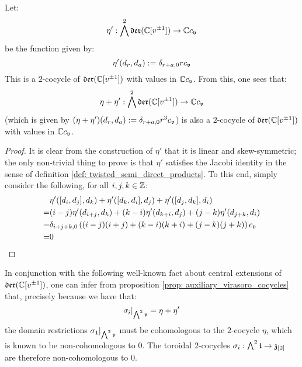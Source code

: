         \begin{proposition} \label{prop: auxiliary_virasoro_cocycles}
            Let:
                $$\eta': \bigwedge^2 \mathfrak{der}(\mathbb{C}[v^{\pm 1}]) \to \mathbb{C} c_{\mathfrak{v}}$$
            be the function given by:
                $$\eta'(d_r, d_a) := \delta_{r + a, 0} r c_{\mathfrak{v}}$$
            This is a $2$-cocycle of $\mathfrak{der}(\mathbb{C}[v^{\pm 1}])$ with values in $\mathbb{C} c_{\mathfrak{v}}$. From this, one sees that:
                $$\eta + \eta': \bigwedge^2 \mathfrak{der}(\mathbb{C}[v^{\pm 1}]) \to \mathbb{C} c_{\mathfrak{v}}$$
            (which is given by $(\eta + \eta')(d_r, d_a) := \delta_{r + a, 0} r^3 c_{\mathfrak{v}}$) is also a $2$-cocycle of $\mathfrak{der}(\mathbb{C}[v^{\pm 1}])$ with values in $\mathbb{C} c_{\mathfrak{v}}$.
        \end{proposition}
            \begin{proof}
                It is clear from the construction of $\eta'$ that it is linear and skew-symmetric; the only non-trivial thing to prove is that $\eta'$ satisfies the Jacobi identity in the sense of definition \ref{def: twisted_semi_direct_products}. To this end, simply consider the following, for all $i, j, k \in \mathbb{Z}$:
                    $$
                        \begin{aligned}
                            & \eta'([d_i, d_j], d_k) + \eta'([d_k, d_i], d_j) + \eta'([d_j, d_k], d_i)
                            \\
                            = & (i - j) \eta'(d_{i + j}, d_k) + (k - i) \eta'(d_{k + i}, d_j) + (j - k) \eta'(d_{j + k}, d_i)
                            \\
                            = & \delta_{i + j + k, 0} \left( (i - j) (i + j) + (k - i) (k + i) + (j - k) (j + k) \right) c_{\mathfrak{v}}
                            \\
                            = & 0
                        \end{aligned}
                    $$
            \end{proof}
        In conjunction with the following well-known fact about central extensions of $\mathfrak{der}(\mathbb{C}[v^{\pm 1}])$, one can infer from proposition \ref{prop: auxiliary_virasoro_cocycles} that, precisely because we have that:
            $$\sigma_i|_{ \bigwedge^2 \mathfrak{v} } = \eta + \eta'$$
        the domain restrictions $\sigma_1|_{ \bigwedge^2 \mathfrak{v} }$ must be cohomologous to the $2$-cocycle $\eta$, which is known to be non-cohomologous to $0$. The toroidal $2$-cocycles $\sigma_i: \bigwedge^2 \mathfrak{t} \to \mathfrak{z}_{[2]}$ are therefore non-cohomologous to $0$.
